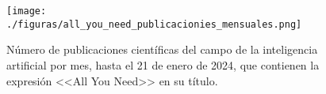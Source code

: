 \begin{figure}[H]
    \caption[Número de publicaciones científicas del campo de la inteligencia artificial por mes que contienen la expresión <<All You Need>> en su título]{Número de publicaciones científicas del campo de la inteligencia artificial por mes, hasta el 21 de enero de 2024, que contienen la expresión <<All You Need>> en su título.}
    \centering
    \texttt{[image: ./figuras/all\_you\_need\_publicacionies\_mensuales.png]}
    \label{fig:all_you_need_publicaciones}
\end{figure}



